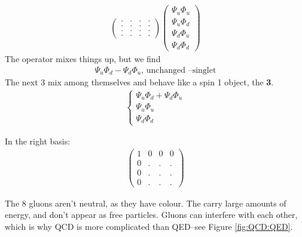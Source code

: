 \documentclass[]{article}
\begin{document}
\begin{align*}
	\begin{pmatrix}
		.&.&.&.\\
		.&.&.&.\\
		.&.&.&.\\
		.&.&.&.
	\end{pmatrix} 	\begin{pmatrix}
\Psi_u\Phi_u\\
\Psi_u\Phi_d\\
\Psi_d\Phi_u\\
\Psi_d\Phi_d
\end{pmatrix} 
\end{align*}
 The operator mixes things up, but we find
\begin{align*}
    \Psi_u\Phi_d-\Psi_d\Phi_u \text{, unchanged --singlet}	
\end{align*}
The next 3 mix among themselves and behave like a spin 1 object, the {\bfseries 3}.
\begin{align*}
	\begin{cases}
		\Psi_u\Phi_d+\Psi_d\Phi_u\\
		\Psi_u\Phi_u\\
		\Psi_d\Phi_d
	\end{cases}
\end{align*}

In the right basis:
\begin{align*}
	\begin{pmatrix}
		1&0&0&0\\
		0&.&.&.\\
		0&.&.&.\\
		0&.&.&.
	\end{pmatrix}
\end{align*}



The 8 gluons aren't neutral, as they have colour. The carry large amounts of energy, and don't appear as free particles. Gluons can interfere with each other, which is why QCD is more complicated than QED--see Figure \ref{fig:QCD:QED}.
 
\end{document}
